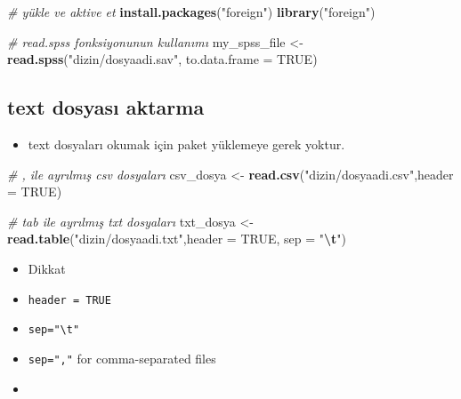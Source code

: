 \documentclass[
  oneside]{book}
\newenvironment{Shaded}{\begin{snugshade}}{\end{snugshade}}
\newcommand{\AttributeTok}[1]{\textcolor[rgb]{0.13,0.29,0.53}{#1}}
\newcommand{\CommentTok}[1]{\textcolor[rgb]{0.56,0.35,0.01}{\textit{#1}}}
\newcommand{\ConstantTok}[1]{\textcolor[rgb]{0.56,0.35,0.01}{#1}}
\newcommand{\FunctionTok}[1]{\textcolor[rgb]{0.13,0.29,0.53}{\textbf{#1}}}
\newcommand{\NormalTok}[1]{#1}
\newcommand{\OtherTok}[1]{\textcolor[rgb]{0.56,0.35,0.01}{#1}}
\newcommand{\SpecialCharTok}[1]{\textcolor[rgb]{0.81,0.36,0.00}{\textbf{#1}}}
\newcommand{\StringTok}[1]{\textcolor[rgb]{0.31,0.60,0.02}{#1}}
\providecommand{\tightlist}{%
  \setlength{\itemsep}{0pt}\setlength{\parskip}{0pt}}
\begin{document}
\begin{Shaded}
\begin{Highlighting}[]
\CommentTok{\# yükle ve aktive et }
\FunctionTok{install.packages}\NormalTok{(}\StringTok{"foreign"}\NormalTok{)}
\FunctionTok{library}\NormalTok{(}\StringTok{"foreign"}\NormalTok{)}

\CommentTok{\# read.spss fonksiyonunun kullanımı}
\NormalTok{my\_spss\_file }\OtherTok{\textless{}{-}} \FunctionTok{read.spss}\NormalTok{(}\StringTok{"dizin/dosyaadi.sav"}\NormalTok{,}
                \AttributeTok{to.data.frame =} \ConstantTok{TRUE}\NormalTok{)}
\end{Highlighting}
\end{Shaded}

\hypertarget{text-dosyasux131-aktarma}{%
\subsection{text dosyası aktarma}\label{text-dosyasux131-aktarma}}

\begin{itemize}
\tightlist
\item
  text dosyaları okumak için paket yüklemeye gerek yoktur.
\end{itemize}

\begin{Shaded}
\begin{Highlighting}[]
\CommentTok{\# , ile ayrılmış csv dosyaları}
\NormalTok{csv\_dosya }\OtherTok{\textless{}{-}} \FunctionTok{read.csv}\NormalTok{(}\StringTok{"dizin/dosyaadi.csv"}\NormalTok{,}\AttributeTok{header =} \ConstantTok{TRUE}\NormalTok{)}

\CommentTok{\# tab ile ayrılmış txt dosyaları}
\NormalTok{txt\_dosya }\OtherTok{\textless{}{-}} \FunctionTok{read.table}\NormalTok{(}\StringTok{"dizin/dosyaadi.txt"}\NormalTok{,}\AttributeTok{header =} \ConstantTok{TRUE}\NormalTok{, }\AttributeTok{sep =} \StringTok{"}\SpecialCharTok{\textbackslash{}t}\StringTok{"}\NormalTok{)}
\end{Highlighting}
\end{Shaded}

\begin{itemize}
\item
  Dikkat
\item
  \texttt{header\ =\ TRUE}
\item
  \texttt{sep="\textbackslash{}t"}
\item
  \texttt{sep=","} for comma-separated files
\item
\end{itemize}
\end{document}
